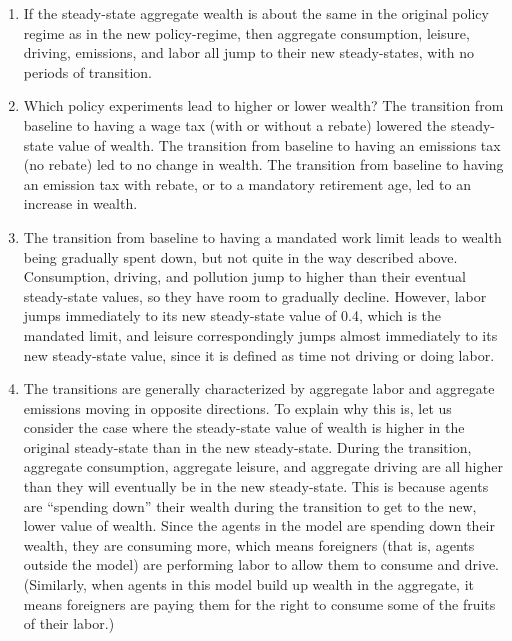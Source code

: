 \documentclass[letter, 12pt, epsf,leqno]{article}
\begin{document}
\begin{enumerate}
\item If the steady-state aggregate wealth is about the same in the original policy regime as in the new policy-regime, then aggregate consumption, leisure, driving, emissions, and labor all jump to their new steady-states, with no periods of transition.

\item  Which policy experiments lead to higher or lower wealth?  The transition from baseline to having a wage tax (with or without a rebate) lowered the steady-state value of wealth.  The transition from baseline to having an emissions tax (no rebate) led to no change in wealth.  The transition from baseline to having an emission tax with rebate, or to a mandatory retirement age, led to an increase in wealth.  

\item  The transition from baseline to having a mandated work limit leads to wealth being gradually spent down, but not quite in the way described above.  Consumption, driving, and pollution jump to higher than their eventual steady-state values, so they have room to gradually decline.  However, labor jumps immediately to its new steady-state value of 0.4, which is the mandated limit, and leisure correspondingly jumps almost immediately to its new steady-state value, since it is defined as time not driving or doing labor.


\item  The transitions are generally characterized by aggregate labor and aggregate emissions moving in opposite directions.  To explain why this is, let us consider the case where the steady-state value of wealth is higher in the original steady-state than in the new steady-state.  During the transition, aggregate consumption, aggregate leisure, and aggregate driving are all higher than they will eventually be in the new steady-state.  This is because agents are ``spending down'' their wealth during the transition to get to the new, lower value of wealth.  Since the agents in the model are spending down their wealth, they are consuming more, which means foreigners (that is, agents outside the model) are performing labor to allow them to consume and drive.  (Similarly, when agents in this model build up wealth in the aggregate, it means foreigners are paying them for the right to consume some of the fruits of their labor.)  



\end{enumerate}


\end{document}
